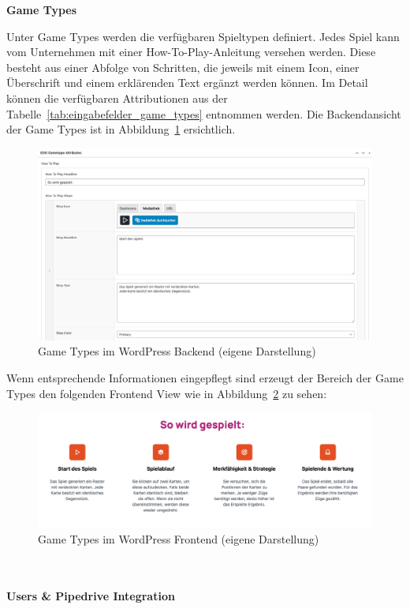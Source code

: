 \newpage
\textbf{Game Types}

Unter Game Types werden die verfügbaren Spieltypen definiert.
Jedes Spiel kann vom Unternehmen mit einer \glqq How-To-Play\grqq{}-Anleitung versehen werden.
Diese besteht aus einer Abfolge von Schritten, die jeweils mit einem Icon, einer Überschrift und einem erklärenden Text ergänzt werden können.
Im Detail können die verfügbaren Attributionen aus der Tabelle~\ref{tab:eingabefelder_game_types} entnommen werden.
Die Backendansicht der Game Types ist in Abbildung~\ref{fig:game-types-settings-legacy} ersichtlich.
\begin{figure}[H]
    \centering
    \includegraphics[width=1\textwidth]{images/legacy_game_types_backend}
    \caption{Game Types im WordPress Backend (eigene Darstellung)}
    \label{fig:game-types-settings-legacy}
\end{figure}
Wenn entsprechende Informationen eingepflegt sind erzeugt der Bereich der Game Types den folgenden Frontend View wie in Abbildung~\ref{fig:game-types-frontend-legacy} zu sehen:
\begin{figure}[H]
    \centering
    \includegraphics[width=1\textwidth]{images/legacy_game_types_frontend}
    \caption{Game Types im WordPress Frontend (eigene Darstellung)}
    \label{fig:game-types-frontend-legacy}
\end{figure}
\\\\
\textbf{Users \& Pipedrive Integration}

